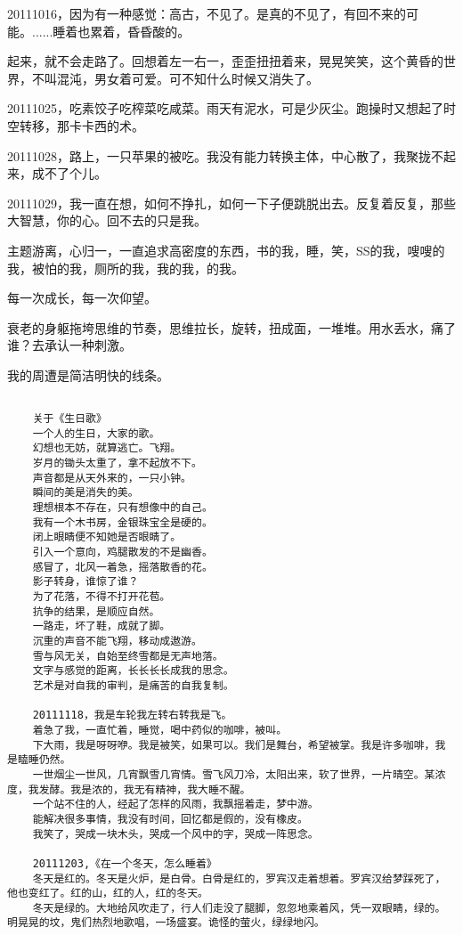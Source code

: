 \documentclass[UTF8]{Diaries}
\begin{document}
20111016，因为有一种感觉：高古，不见了。是真的不见了，有回不来的可能。......睡着也累着，昏昏酸的。

起来，就不会走路了。回想着左一右一，歪歪扭扭着来，晃晃笑笑，这个黄昏的世界，不叫混沌，男女着可爱。可不知什么时候又消失了。

20111025，吃素饺子吃榨菜吃咸菜。雨天有泥水，可是少灰尘。跑操时又想起了时空转移，那卡卡西的术。

20111028，路上，一只苹果的被吃。我没有能力转换主体，中心散了，我聚拢不起来，成不了个儿。

20111029，我一直在想，如何不挣扎，如何一下子便跳脱出去。反复着反复，那些大智慧，你的心。回不去的只是我。

主题游离，心归一，一直追求高密度的东西，书的我，睡，笑，SS的我，嗖嗖的我，被怕的我，厕所的我，我的我，的我。

每一次成长，每一次仰望。

衰老的身躯拖垮思维的节奏，思维拉长，旋转，扭成面，一堆堆。用水丢水，痛了谁？去承认一种刺激。

我的周遭是简洁明快的线条。


\begin{lstlisting}

    关于《生日歌》
    一个人的生日，大家的歌。
    幻想也无妨，就算逃亡。飞翔。
    岁月的锄头太重了，拿不起放不下。
    声音都是从天外来的，一只小钟。
    瞬间的美是消失的美。
    理想根本不存在，只有想像中的自己。
    我有一个木书房，金银珠宝全是硬的。
    闭上眼睛便不知她是否眼睛了。
    引入一个意向，鸡腿散发的不是幽香。
    感冒了，北风一着急，摇落散香的花。
    影子转身，谁惊了谁？
    为了花落，不得不打开花苞。
    抗争的结果，是顺应自然。
    一路走，坏了鞋，成就了脚。
    沉重的声音不能飞翔，移动成遨游。
    雪与风无关，自始至终雪都是无声地落。
    文字与感觉的距离，长长长长成我的思念。
    艺术是对自我的审判，是痛苦的自我复制。

    20111118，我是车轮我左转右转我是飞。
    着急了我，一直忙着，睡觉，喝中药似的咖啡，被叫。
    下大雨，我是呀呀咿。我是被笑，如果可以。我们是舞台，希望被掌。我是许多咖啡，我是瞌睡仍然。
    一世烟尘一世风，几宵飘雪几宵情。雪飞风刀冷，太阳出来，软了世界，一片晴空。某浓度，我发酵。我是浓的，我无有精神，我大睡不醒。
    一个站不住的人，经起了怎样的风雨，我飘摇着走，梦中游。
    能解决很多事情，我没有时间，回忆都是假的，没有橡皮。
    我笑了，哭成一块木头，哭成一个风中的字，哭成一阵思念。

    20111203,《在一个冬天，怎么睡着》
    冬天是红的。冬天是火炉，是白骨。白骨是红的，罗宾汉走着想着。罗宾汉给梦踩死了，他也变红了。红的山，红的人，红的冬天。
    冬天是绿的。大地给风吹走了，行人们走没了腿脚，忽忽地乘着风，凭一双眼睛，绿的。明晃晃的坟，鬼们热烈地歌唱，一场盛宴。诡怪的萤火，绿绿地闪。
    
\end{lstlisting}
 
\end{document}
